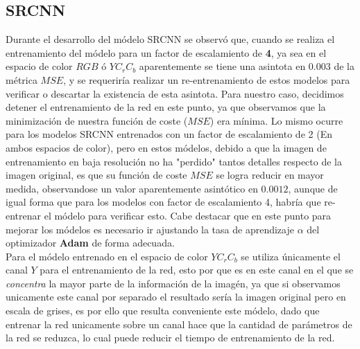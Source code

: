 \subsection{SRCNN}
Durante el desarrollo del módelo SRCNN se observó que, cuando se realiza el entrenamiento del módelo para un factor de escalamiento
de \textbf{4}, ya sea en el espacio de color $RGB$ ó $YC_rC_b$ aparentemente se tiene una asintota en $0.003$ de la métrica $MSE$,
y se requeriría realizar un re-entrenamiento de estos modelos para verificar o descartar la existencia de esta asintota. Para
nuestro caso, decidimos detener el entrenamiento de la red en este punto, ya que observamos que la minimización de nuestra función
de coste ($MSE$) era mínima. Lo mismo ocurre para los modelos SRCNN entrenados con un factor de escalamiento de 2 (En ambos
espacios de color), pero en estos módelos, debido a que la imagen de entrenamiento en baja resolución no ha "perdido" tantos
detalles respecto de la imagen original, es que su función de coste $MSE$ se logra reducir en mayor medida, observandose un valor
aparentemente asintótico en $0.0012$, aunque de igual forma que para los modelos con factor de escalamiento 4, habría que re-entrenar
el módelo para verificar esto. Cabe destacar que en este punto para mejorar los módelos es necesario ir ajustando la tasa de aprendizaje
$\alpha$ del optimizador \textbf{Adam} de forma adecuada.\\
Para el módelo entrenado en el espacio de color $YC_rC_b$ se utiliza únicamente el canal $Y$ para el entrenamiento de la red,
esto por que es en este canal en el que se \emph{concentra} la mayor parte de la información de la imagén, ya que si observamos
unicamente este canal por separado el resultado sería la imagen original pero en escala de grises, es por ello que resulta conveniente
este módelo, dado que entrenar la red unicamente sobre un canal hace que la cantidad de parámetros de la red se reduzca, lo cual
puede reducir el tiempo de entrenamiento de la red.